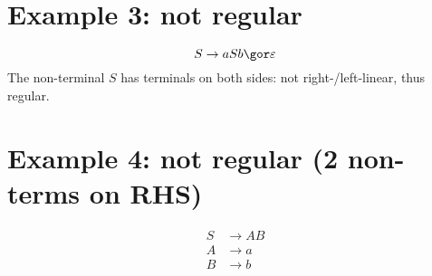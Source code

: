 \begin{minipage}{.5\linewidth}
\section*{Example 3: not regular}
\[
  S\to aSb\gor \varepsilon
\]
The non-terminal $S$ has terminals on both sides: not right-/left-linear, thus  regular.
\end{minipage}
\begin{minipage}{.5\linewidth}
\section*{Example 4: not regular (2 non-terms on RHS)}
\begin{align*}
  S&\to AB \\
  A&\to a\\
  B&\to b
\end{align*}
\end{minipage}
